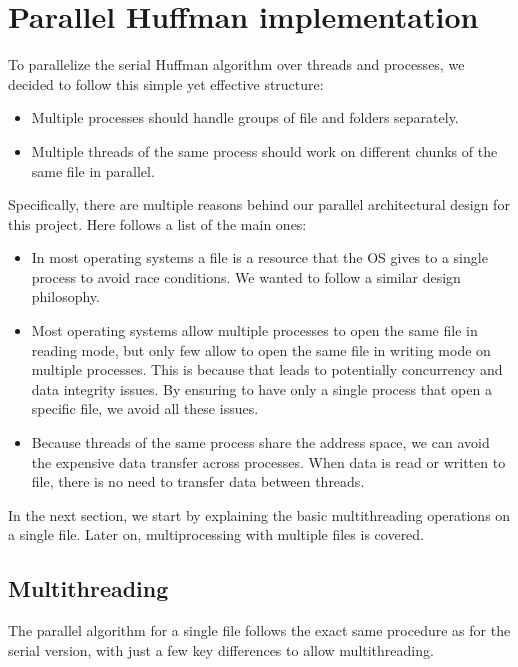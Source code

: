 \section{Parallel Huffman implementation}
To parallelize the serial Huffman algorithm over threads and processes, we decided to follow this simple yet effective structure:
\begin{itemize}
    \item Multiple processes should handle groups of file and folders separately.
    \item Multiple threads of the same process should work on different chunks of the same file in parallel.
\end{itemize}
Specifically, there are multiple reasons behind our parallel architectural design for this project. Here follows a list of the main ones:
\begin{itemize}
	\item In most operating systems a file is a resource that the OS gives to a single process to avoid race conditions. We wanted to follow a similar design philosophy.
	\item Most operating systems allow multiple processes to open the same file in reading mode, but only few allow to open the same file in writing mode on multiple processes. This is because that leads to potentially concurrency and data integrity issues. By ensuring to have only a single process that open a specific file, we avoid all these issues.
	\item Because threads of the same process share the address space, we can avoid the expensive data transfer across processes. When data is read or written to file, there is no need to transfer data between threads.
\end{itemize}
In the next section, we start by explaining the basic multithreading operations on a single file. Later on, multiprocessing with multiple files is covered.

\subsection{Multithreading}

The parallel algorithm for a single file follows the exact same procedure as for the serial version, with just a few key differences to allow multithreading. 

